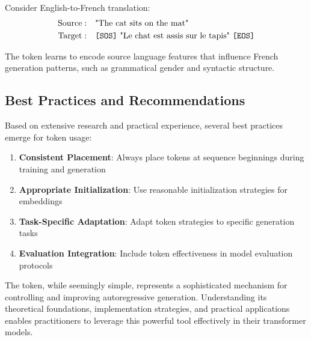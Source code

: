 \begin{example}
Consider English-to-French translation:
\begin{align}
\text{Source}: &\quad \text{"The cat sits on the mat"} \\
\text{Target}: &\quad \text{\texttt{[SOS]}{} "Le chat est assis sur le tapis" \texttt{[EOS]}{}}
\end{align}

The \sos{} token learns to encode source language features that influence French generation patterns, such as grammatical gender and syntactic structure.
\end{example}

\subsection{Best Practices and Recommendations}

Based on extensive research and practical experience, several best practices emerge for \sos{} token usage:

\begin{enumerate}
\item \textbf{Consistent Placement}: Always place \sos{} tokens at sequence beginnings during training and generation
\item \textbf{Appropriate Initialization}: Use reasonable initialization strategies for \sos{} embeddings
\item \textbf{Task-Specific Adaptation}: Adapt \sos{} token strategies to specific generation tasks
\item \textbf{Evaluation Integration}: Include \sos{} token effectiveness in model evaluation protocols
\end{enumerate}

The \sos{} token, while seemingly simple, represents a sophisticated mechanism for controlling and improving autoregressive generation. Understanding its theoretical foundations, implementation strategies, and practical applications enables practitioners to leverage this powerful tool effectively in their transformer models.